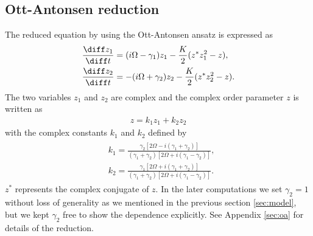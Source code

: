 



\subsection{Ott-Antonsen reduction}
\label{oa}


The reduced equation by using the Ott-Antonsen ansatz is expressed as
\cite{terada2017}
\begin{align}
\begin{aligned}
    &\frac{\diff z_{1}}{\diff t}=(i\Omega-\gamma_{1})z_{1}-\frac{K}{2}(z^{*}z_{1}^{2}-z),\\
    &\frac{\diff z_{2}}{\diff t}=-(i\Omega+\gamma_{2})z_{2}-\frac{K}{2}(z^{*}z_{2}^{2}-z).
\end{aligned}
  \label{eq:oa-12}
\end{align}
The two variables $z_{1}$ and $z_{2}$ are complex
and the complex order parameter $z$ is written as
\begin{align}
  z=k_{1}z_{1}+k_{2}z_{2}
\end{align}
with the complex constants $k_{1}$ and $k_{2}$ defined by
\begin{align}
\begin{aligned}
&k_{1}=\frac{\gamma_{2}[2\Omega-i(\gamma_{1}+\gamma_{2})]}{(\gamma_{1}+\gamma_{2})[2\Omega+i(\gamma_{1}-\gamma_{2})]},\\
    &k_{2}=\frac{\gamma_{1}[2\Omega+i(\gamma_{1}+\gamma_{2})]}{(\gamma_{1}+\gamma_{2})[2\Omega+i(\gamma_{1}-\gamma_{2})]}.
\end{aligned}
  \label{eq:k1k2}
\end{align}
$z^{\ast}$ represents the complex conjugate of $z$.
In the later computations we set $\gamma_{2}=1$ without loss of generality
as we mentioned in the previous section \ref{sec:model},
but we kept $\gamma_{2}$ free to show the dependence explicitly.
See Appendix \ref{sec:oa} for details of the reduction.


